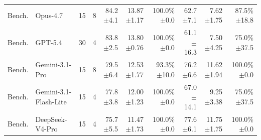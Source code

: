 \begin{table}[t]
{\begin{tabular}{llrrrrrrrr}
Bench. & Opus-4.7 & 15 & 8 & \shortstack[r]{84.2\\{\scriptsize $\pm$4.1}} & \shortstack[r]{13.87\\{\scriptsize $\pm$1.17}} & \shortstack[r]{100.0\%\\{\scriptsize $\pm$0.0}} & \shortstack[r]{62.7\\{\scriptsize $\pm$7.1}} & \shortstack[r]{7.62\\{\scriptsize $\pm$1.75}} & \shortstack[r]{87.5\%\\{\scriptsize $\pm$18.8}} \\
Bench. & GPT-5.4 & 30 & 4 & \shortstack[r]{83.8\\{\scriptsize $\pm$2.5}} & \shortstack[r]{13.80\\{\scriptsize $\pm$0.76}} & \shortstack[r]{100.0\%\\{\scriptsize $\pm$0.0}} & \shortstack[r]{61.1\\{\scriptsize $\pm$16.3}} & \shortstack[r]{7.50\\{\scriptsize $\pm$4.25}} & \shortstack[r]{75.0\%\\{\scriptsize $\pm$37.5}} \\
Bench. & Gemini-3.1-Pro & 15 & 8 & \shortstack[r]{79.5\\{\scriptsize $\pm$6.4}} & \shortstack[r]{12.53\\{\scriptsize $\pm$1.77}} & \shortstack[r]{93.3\%\\{\scriptsize $\pm$10.0}} & \shortstack[r]{76.2\\{\scriptsize $\pm$6.6}} & \shortstack[r]{11.62\\{\scriptsize $\pm$1.94}} & \shortstack[r]{100.0\%\\{\scriptsize $\pm$0.0}} \\
Bench. & Gemini-3.1-Flash-Lite & 15 & 4 & \shortstack[r]{77.8\\{\scriptsize $\pm$3.8}} & \shortstack[r]{12.00\\{\scriptsize $\pm$1.23}} & \shortstack[r]{100.0\%\\{\scriptsize $\pm$0.0}} & \shortstack[r]{67.0\\{\scriptsize $\pm$14.1}} & \shortstack[r]{9.25\\{\scriptsize $\pm$3.38}} & \shortstack[r]{75.0\%\\{\scriptsize $\pm$37.5}} \\
Bench. & DeepSeek-V4-Pro & 15 & 4 & \shortstack[r]{75.7\\{\scriptsize $\pm$5.5}} & \shortstack[r]{11.47\\{\scriptsize $\pm$1.73}} & \shortstack[r]{100.0\%\\{\scriptsize $\pm$0.0}} & \shortstack[r]{77.6\\{\scriptsize $\pm$6.1}} & \shortstack[r]{11.75\\{\scriptsize $\pm$1.75}} & \shortstack[r]{100.0\%\\{\scriptsize $\pm$0.0}} \\

\end{tabular}}
\end{table}
